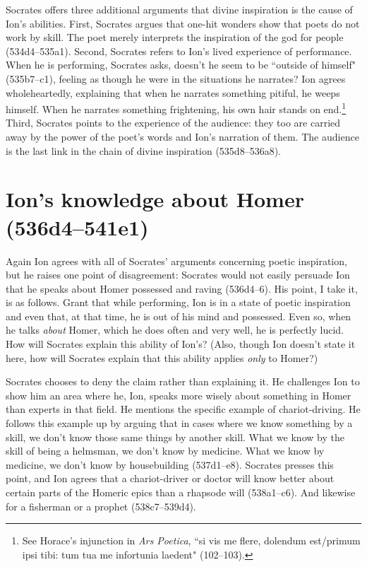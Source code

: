 \documentclass[12pt,letterpaper]{article}
\begin{document}
Socrates offers three additional arguments that divine inspiration is the cause of Ion's abilities. First, Socrates argues that one-hit wonders show that poets do not work by skill. The poet merely interprets the inspiration of the god for people (534d4--535a1). Second, Socrates refers to Ion's lived experience of performance. When he is performing, Socrates asks, doesn't he seem to be ``outside of himself" (535b7--c1), feeling as though he were in the situations he narrates? Ion agrees wholeheartedly, explaining that when he narrates something pitiful, he weeps himself. When he narrates something frightening, his own hair stands on end.\footnote{See Horace's injunction in \textit{Ars Poetica}, ``si vis me flere, dolendum est/primum ipsi tibi: tum tua me infortunia laedent" (102--103).}  Third, Socrates points to the experience of the audience: they too are carried away by the power of the poet's words and Ion's narration of them. The audience is the last link in the chain of divine inspiration (535d8--536a8).


\section{Ion's knowledge about Homer (536d4--541e1)}

Again Ion agrees with all of Socrates' arguments concerning poetic
inspiration, but he raises one point of disagreement: Socrates would not
easily persuade Ion that he speaks about Homer possessed and raving
(536d4--6). His point, I take it, is as follows. Grant that while
performing, Ion is in a state of poetic inspiration and even that, at that
time, he is out of his mind and possessed. Even so, when he talks
\emph{about} Homer, which he does often and very well, he is perfectly
lucid. How will Socrates explain this ability of Ion's? (Also, though Ion
doesn't state it here, how will Socrates explain that this ability applies
\emph{only} to Homer?)

Socrates chooses to deny the claim rather than explaining it. He challenges Ion to show him an area where he, Ion, speaks more wisely about something in Homer than experts in that field. He mentions the specific example of chariot-driving. He follows this example up by arguing that in cases where we know something by a skill, we don't know those same things by another skill. What we know by the skill of being a helmsman, we don't know by medicine. What we know by medicine, we don't know by housebuilding (537d1--e8). Socrates presses this point, and Ion agrees that a chariot-driver or doctor will know better about certain parts of the Homeric epics than a rhapsode will (538a1--c6). And likewise for a fisherman or a prophet (538c7--539d4).
\end{document}

